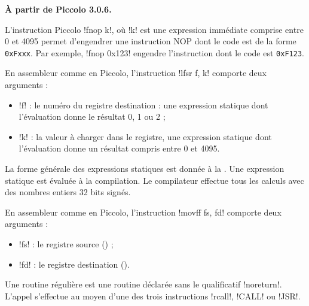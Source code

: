 \textbf{À partir de Piccolo 3.0.6.}

L'instruction Piccolo \pic!fnop k!, où \pic!k! est une expression immédiate comprise entre 0 et 4095 permet d'engendrer une instruction NOP dont le code est de la forme \texttt{0xFxxx}. Par exemple, \pic!fnop 0x123! engendre l'instruction dont le code est \texttt{0xF123}.


En assembleur comme en Piccolo, l'instruction \pic!lfsr f, k! comporte deux arguments :
\begin{itemize}
  \item \pic!f! : le numéro du registre destination : une expression statique dont l’évaluation donne le résultat 0, 1 ou 2 ;
  \item \pic!k! : la valeur à charger dans le registre, une expression statique dont l’évaluation donne un résultat compris entre 0 et 4095.
\end{itemize}

La forme générale des expressions statiques est donnée à la . Une expression statique est évaluée à la compilation. Le compilateur effectue tous les calculs avec des nombres entiers 32 bits signés.








En assembleur comme en Piccolo, l'instruction \pic!movff fs, fd! comporte deux arguments :
\begin{itemize}
  \item \pic!fs! : le registre source () ;
  \item \pic!fd! : le registre destination ().
\end{itemize}









Une routine régulière est une routine déclarée sans le qualificatif \pic!noreturn!. L'appel s’effectue au moyen d’une des trois instructions \pic!rcall!, \pic!CALL! ou \pic!JSR!.

